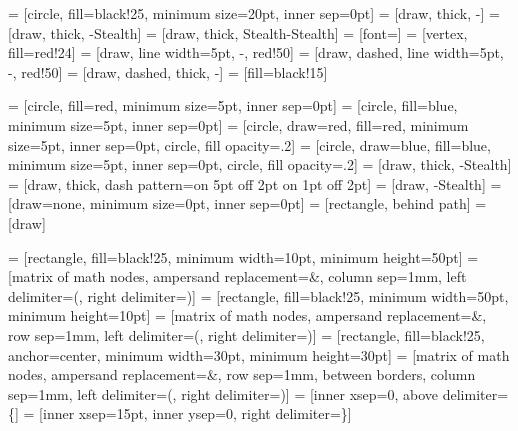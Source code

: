 \usepackage{tikz}
\usetikzlibrary{spy, arrows, arrows.meta, calc, decorations.pathmorphing, decorations.pathreplacing, fit, matrix, patterns, shapes, shapes.multipart, shapes.misc, positioning, plotmarks}
\usepackage{pgfplots}
\usepackage[margin=.75cm]{caption}       %
\usepackage[margin=.5cm, labelformat=simple]{subcaption}    %
\usepackage{csvsimple}


 = [circle, fill=black!25, minimum size=20pt, inner sep=0pt]
 = [draw, thick, -]
 = [draw, thick, -Stealth]
 = [draw, thick, Stealth-Stealth]
 = [font=\small]
 = [vertex, fill=red!24]
 = [draw, line width=5pt, -, red!50]
 = [draw, dashed, line width=5pt, -, red!50]
 = [draw, dashed, thick, -]
 = [fill=black!15]

 = [circle, fill=red, minimum size=5pt, inner sep=0pt]
 = [circle, fill=blue, minimum size=5pt, inner sep=0pt]
 = [circle, draw=red, fill=red, minimum size=5pt, inner sep=0pt, circle, fill opacity=.2]
 = [circle, draw=blue, fill=blue, minimum size=5pt, inner sep=0pt, circle, fill opacity=.2]
 = [draw, thick, -Stealth]
 = [draw, thick, dash pattern=on 5pt off 2pt on 1pt off 2pt]
 = [draw, -Stealth]
 = [draw=none, minimum size=0pt, inner sep=0pt]
 = [rectangle, behind path]
 = [draw]

 = [rectangle, fill=black!25, minimum width=10pt, minimum height=50pt]
 = [matrix of math nodes, ampersand replacement=\&, column sep=1mm, left delimiter=(, right delimiter=)]
 = [rectangle, fill=black!25, minimum width=50pt, minimum height=10pt]
 = [matrix of math nodes, ampersand replacement=\&, row sep=1mm, left delimiter=(, right delimiter=)]
 = [rectangle, fill=black!25, anchor=center, minimum width=30pt, minimum height=30pt]
 = [matrix of math nodes, ampersand replacement=\&, row sep={1mm, between borders}, column sep=1mm, left delimiter=(, right delimiter=)]
 = [inner xsep=0, above delimiter=\{]
 = [inner xsep=15pt, inner ysep=0, right delimiter=\}]

